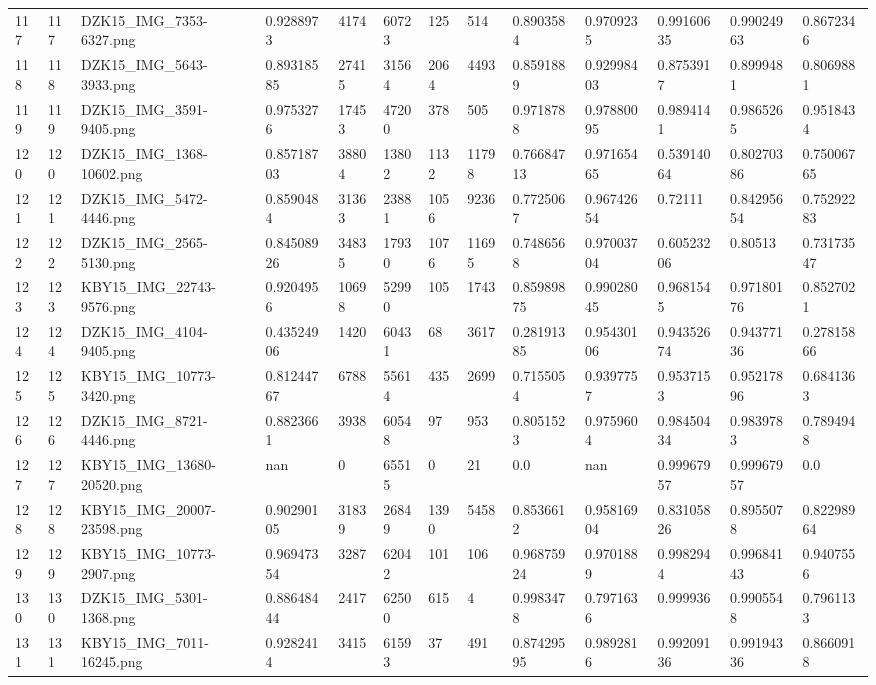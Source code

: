 \documentclass[11pt, a4paper, twoside]{report}
\begin{document}
\begin{longtable}[c]{@{}lllllllllllll@{}}
117 & 117 & DZK15\_IMG\_7353-6327.png & 0.9288973 & 4174 & 60723 & 125 & 514 & 0.8903584 & 0.9709235 & 0.99160635 & 0.99024963 & 0.8672346 \\
118 & 118 & DZK15\_IMG\_5643-3933.png & 0.89318585 & 27415 & 31564 & 2064 & 4493 & 0.8591889 & 0.92998403 & 0.8753917 & 0.8999481 & 0.8069881 \\
119 & 119 & DZK15\_IMG\_3591-9405.png & 0.9753276 & 17453 & 47200 & 378 & 505 & 0.9718788 & 0.97880095 & 0.9894141 & 0.9865265 & 0.9518434 \\
120 & 120 & DZK15\_IMG\_1368-10602.png & 0.85718703 & 38804 & 13802 & 1132 & 11798 & 0.76684713 & 0.97165465 & 0.53914064 & 0.80270386 & 0.75006765 \\
121 & 121 & DZK15\_IMG\_5472-4446.png & 0.8590484 & 31363 & 23881 & 1056 & 9236 & 0.7725067 & 0.96742654 & 0.72111 & 0.84295654 & 0.75292283 \\
122 & 122 & DZK15\_IMG\_2565-5130.png & 0.84508926 & 34835 & 17930 & 1076 & 11695 & 0.7486568 & 0.97003704 & 0.60523206 & 0.80513 & 0.73173547 \\
123 & 123 & KBY15\_IMG\_22743-9576.png & 0.9204956 & 10698 & 52990 & 105 & 1743 & 0.85989875 & 0.99028045 & 0.9681545 & 0.97180176 & 0.8527021 \\
124 & 124 & DZK15\_IMG\_4104-9405.png & 0.43524906 & 1420 & 60431 & 68 & 3617 & 0.28191385 & 0.95430106 & 0.94352674 & 0.94377136 & 0.27815866 \\
125 & 125 & KBY15\_IMG\_10773-3420.png & 0.81244767 & 6788 & 55614 & 435 & 2699 & 0.7155054 & 0.9397757 & 0.9537153 & 0.95217896 & 0.6841363 \\
126 & 126 & DZK15\_IMG\_8721-4446.png & 0.8823661 & 3938 & 60548 & 97 & 953 & 0.8051523 & 0.9759604 & 0.98450434 & 0.9839783 & 0.7894948 \\
127 & 127 & KBY15\_IMG\_13680-20520.png & nan & 0 & 65515 & 0 & 21 & 0.0 & nan & 0.99967957 & 0.99967957 & 0.0 \\
128 & 128 & KBY15\_IMG\_20007-23598.png & 0.90290105 & 31839 & 26849 & 1390 & 5458 & 0.8536612 & 0.95816904 & 0.83105826 & 0.8955078 & 0.82298964 \\
129 & 129 & KBY15\_IMG\_10773-2907.png & 0.96947354 & 3287 & 62042 & 101 & 106 & 0.96875924 & 0.9701889 & 0.9982944 & 0.99684143 & 0.9407556 \\
130 & 130 & DZK15\_IMG\_5301-1368.png & 0.88648444 & 2417 & 62500 & 615 & 4 & 0.9983478 & 0.7971636 & 0.999936 & 0.9905548 & 0.7961133 \\
131 & 131 & KBY15\_IMG\_7011-16245.png & 0.9282414 & 3415 & 61593 & 37 & 491 & 0.87429595 & 0.9892816 & 0.99209136 & 0.99194336 & 0.8660918 \\

\end{longtable}
\end{document}
